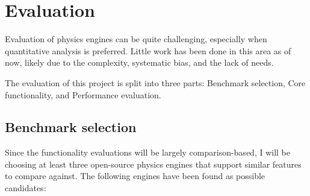 
\section{Evaluation}

Evaluation of physics engines can be quite challenging, 
especially when quantitative analysis is preferred.
Little work has been done in this area as of now, 
likely due to the complexity, systematic bias, and the lack of needs.

The evaluation of this project is split into three parts: Benchmark selection, Core functionality, and Performance evaluation.

\subsection{Benchmark selection}

Since the functionality evaluations will be largely comparison-based,
I will be choosing at least three open-source physics engines that support similar features to compare against.
The following engines have been found as possible candidates:

\begin{table}[h]
    \centering
\end{table}

